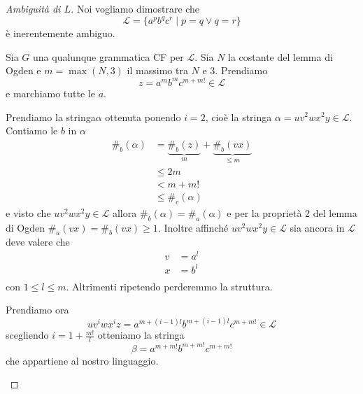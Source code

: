 \documentclass[12pt]{report}
\theoremstyle{definition}
\begin{document}
\begin{proof}[Ambiguità di $L$]
	Noi vogliamo dimostrare che
	$$ \mathcal{L} = \{ a^p b^q c^r \mid p = q \vee q = r \} $$
	è inerentemente ambiguo.
	
	Sia $G$ una qualunque grammatica CF per $\mathcal{L}$.
	Sia $N$ la costante del lemma di Ogden e $m = \max(N, 3) $ il massimo tra $N$ e 3.
	Prendiamo 
	$$ z = a^m b^m c^{m + m!} \in \mathcal{L}$$
	e marchiamo tutte le $a$.

	Prendiamo la stringa$\alpha$ ottenuta ponendo $i = 2$, cioè la stringa $\alpha = u v^2 w x^2 y \in \mathcal{L}$.
	Contiamo le $b$ in $\alpha$
	\begin{align*}
		\#_b(\alpha) &= \underbrace{\#_b(z)}_{m} + \underbrace{\#_b(vx)}_{\leq m} \\
		&\leq 2m \\ 
		&< m + m! \tag{Visto che $m$ è almeno 3} \\
		&\leq \#_c(\alpha) \tag{Le $c$ rimaste sono almeno quelle che c'erano prima}
	\end{align*}
	e visto che $uv^2 w x^2 y \in \mathcal{L}$ allora $\#_b(\alpha) = \#_a(\alpha)$ e per la proprietà 2 del lemma di Ogden $\#_a(vx) = \#_b(vx) \geq 1$.
	Inoltre affinché $u v^2 w x^2 y \in \mathcal{L}$ sia ancora in $\mathcal{L}$ deve valere che
	\begin{align*}
		v &= a^l \\
		x &= b^l \\
	\end{align*}
	con $1 \leq l \leq m$.
	Altrimenti ripetendo perderemmo la struttura.

	Prendiamo ora
	$$ u v^i w x^i z = a^{m + (i - 1)l}b^{m + (i - 1)l} c^{m + m!} \in \mathcal{L} $$
	scegliendo $i = 1 + \frac{m!}{l}$ otteniamo la stringa 
	$$ \beta = a^{m + m!} b^{m + m!} c^{m + m!} $$
	che appartiene al nostro linguaggio.
	\begin{figure}[H]
		\centering
		\begin{subfigure}{.3\textwidth}
			\centering
\end{subfigure}
\end{figure}
\end{proof}
\end{document}
